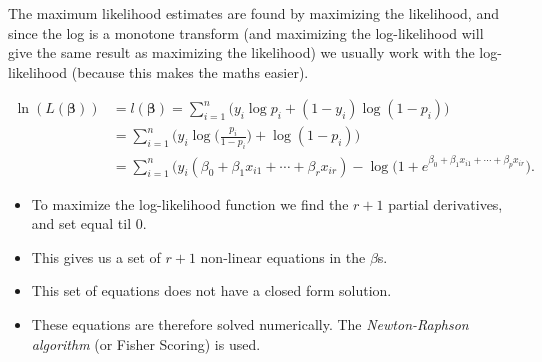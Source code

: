 \documentclass[10pt,ignorenonframetext,]{beamer}
\providecommand{\tightlist}{%
  \setlength{\itemsep}{0pt}\setlength{\parskip}{0pt}}
\begin{document}
\begin{frame}

The maximum likelihood estimates are found by maximizing the likelihood,
and since the log is a monotone transform (and maximizing the
log-likelihood will give the same result as maximizing the likelihood)
we usually work with the log-likelihood (because this makes the maths
easier).

\begin{align*} \ln(L(\boldsymbol{\beta}))&=l(\boldsymbol{\beta}) =\sum_{i=1}^n \Big ( y_i \log p_i + (1-y_i) \log(1 - p_i )\Big ) \\ &= \sum_{i=1}^n \Big ( y_i \log \Big (\frac{p_i}{1-p_i} \Big) + \log(1-p_i) \Big ) \\
&= \sum_{i=1}^n \Big (y_i (\beta_0 + \beta_1 x_{i1}+\cdots + \beta_r x_{ir}) - \log(1 + e^{\beta_0 + \beta_1 x_{i1}+\cdots + \beta_p x_{ir}} \Big ).\end{align*}

\end{frame}

\begin{frame}

\begin{itemize}
\tightlist
\item
  To maximize the log-likelihood function we find the \(r+1\) partial
  derivatives, and set equal til 0.
\item
  This gives us a set of \(r+1\) non-linear equations in the \(\beta\)s.
\item
  This set of equations does not have a closed form solution.
\item
  These equations are therefore solved numerically. The
  \emph{Newton-Raphson algorithm} (or Fisher Scoring) is used.
\end{itemize}

\end{frame}
\end{document}
